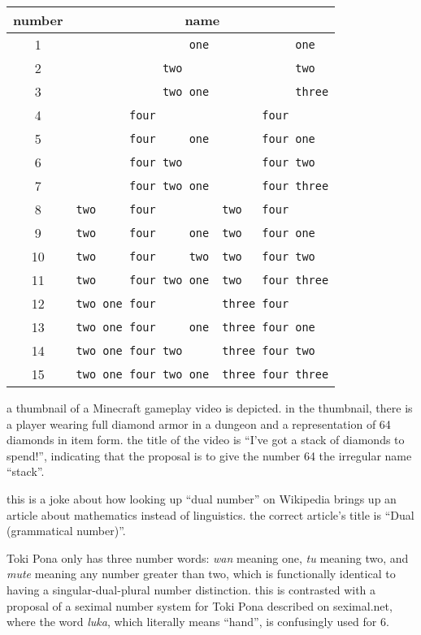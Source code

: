 \documentclass[../footnotes.tex]{subfiles}
\begin{document}
\begin{center}
	\begin{tabular}{|c|l|l|}
		\hline
		\bf number & \multicolumn{2}{|c|}{\bf name} \\
		\hline
		1  & \verb#                 one# & \verb#           one  # \\
		2  & \verb#             two    # & \verb#           two  # \\
		3  & \verb#             two one# & \verb#           three# \\
		4  & \verb#        four        # & \verb#      four      # \\
		5  & \verb#        four     one# & \verb#      four one  # \\
		6  & \verb#        four two    # & \verb#      four two  # \\
		7  & \verb#        four two one# & \verb#      four three# \\
		8  & \verb#two     four        # & \verb#two   four      # \\
		9  & \verb#two     four     one# & \verb#two   four one  # \\
		10 & \verb#two     four     two# & \verb#two   four two  # \\
		11 & \verb#two     four two one# & \verb#two   four three# \\
		12 & \verb#two one four        # & \verb#three four      # \\
		13 & \verb#two one four     one# & \verb#three four one  # \\
		14 & \verb#two one four two    # & \verb#three four two  # \\
		15 & \verb#two one four two one# & \verb#three four three# \\
		\hline
	\end{tabular}
\end{center}

 a thumbnail of a Minecraft gameplay video is depicted. in the thumbnail, there is a player wearing full diamond armor in a dungeon and a representation of 64 diamonds in item form. the title of the video is ``I've got a stack of diamonds to spend!'', indicating that the proposal is to give the number 64 the irregular name ``stack''.

 this is a joke about how looking up ``dual number'' on Wikipedia brings up an article about mathematics instead of linguistics. the correct article's title is ``Dual (grammatical number)''.

 Toki Pona only has three number words: {\it wan} meaning one, {\it tu} meaning two, and {\it mute} meaning any number greater than two, which is functionally identical to having a singular-dual-plural number distinction. this is contrasted with a proposal of a seximal number system for Toki Pona described on seximal.net, where the word {\it luka}, which literally means ``hand'', is confusingly used for 6.
\end{document}
